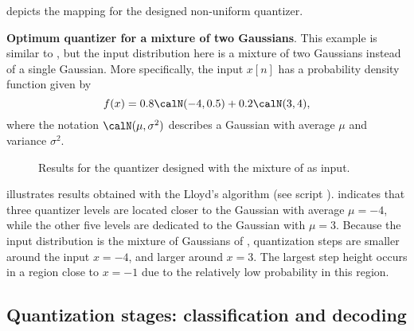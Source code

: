  depicts the mapping for the designed non-uniform quantizer.
\eExample

\bExample \textbf{Optimum quantizer for a mixture of two Gaussians}.
This example is similar to , but the input distribution here is a mixture of two Gaussians instead of
a single Gaussian. More specifically, the input $x[n]$ has a probability density function given by
\begin{equation}
f(x) = 0.8 \calN(-4, 0.5) + 0.2 \calN(3, 4),
\label{eq:mixture_of_gaussians}
\end{equation}
where the notation $\calN(\mu,\sigma^2)$ describes a Gaussian with average $\mu$ and variance $\sigma^2$.

\begin{figure}[!htb]
  \begin{center}
  \end{center}
  \caption{Results for the quantizer designed with the mixture of  as input.\label{fig:mixture_quantization}}
\end{figure}

 illustrates results obtained with the Lloyd's algorithm (see script ). 
 indicates that three quantizer levels are located closer to the Gaussian with average 
$\mu=-4$, while the other five levels are dedicated to the Gaussian with $\mu=3$.
Because the input distribution is the mixture of Gaussians of , quantization steps are smaller around the input $x=-4$, and larger around $x=3$. The largest step height occurs in a region close to $x=-1$ due to the relatively low probability in this region.
\eExample

\subsection{Quantization stages: classification and decoding}

